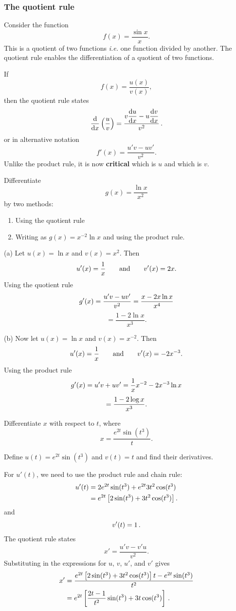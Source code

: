 \subsubsection{The quotient rule}
\label{sec:quotient}

Consider the function
\[
f(x)=\frac{\sin x}{x}.
\]
This is a quotient of two functions \textit{i.e.} one function divided by another. The quotient rule enables the differentiation of a quotient of two functions.

If
\[
f(x)=\frac{u(x)}{v(x)},
\]
then the quotient rule states
\begin{equation}
    \frac{{\rm d} }{{\rm d} x}\left(\frac{u}{v}\right)
= \frac{v\dfrac{{\rm d}u}{{\rm d}x}-u\dfrac{{\rm d}v}{{\rm d}x}}{v^2} \, .
\end{equation}
or in alternative notation
\[
f'(x)=\frac{u'v-uv'}{v^2}.
\]
Unlike the product rule, it is now \textbf{critical} which is $u$ and which is $v$.

\goodbreak
\begin{example}[Lecture]
Differentiate
\[
g(x)=\frac{\ln x}{x^2}
\]
by two methods:
\begin{enumerate}
\item[(a)] Using the quotient rule
\item[(b)] Writing as $g(x)=x^{-2}\ln x$ and using the product rule.
\end{enumerate}
\end{example}
%
\begin{solution}
(a) Let $u(x)=\ln x$ and $v(x)=x^2$. Then
\[
u'(x)=\frac{1}{x}
\qquad\text{and}\qquad
v'(x)=2x.
\]
Using the quotient rule
\[
g'(x)=\frac{u'v-uv'}{v^2}=\frac{x-2x\ln x}{x^4}
\]
\[
=\frac{1-2\ln x}{x^3}.
\]

(b) Now let $u(x)=\ln x$ and $v(x)=x^{-2}$. Then
\[
u'(x)=\frac{1}{x}
\qquad\text{and}\qquad
v'(x)=-2x^{-3}.
\]
Using the product rule
\[
g'(x)=u'v+uv'=\frac{1}{x}x^{-2}-2x^{-3}\ln x
\]
\[
=\frac{1-2\log x}{x^3}.
\]
\end{solution}

\goodbreak
\begin{example}[Video]
Differentiate $x$ with respect to $t$, where
\[
x=\frac{e^{2t}\sin(t^3)}{t}.
\]
\end{example}
%
\begin{solution}
Define $u(t)=e^{2t}\sin(t^3)$ and $v(t)=t$ and find their derivatives.

For $u'(t)$, we need to use the product rule and chain rule:
\begin{align*}
u'(t)&=2e^{2t}\sin(t^3)+e^{2t}3t^2\cos(t^3)\\
&=e^{2t}\left[2\sin(t^3)+3t^2\cos(t^3)\right].
\end{align*}
and
\[
v'(t)=1\, .
\]
The quotient rule states
\[
x'=\frac{u'v-v'u}{v^2}.
\]
Substituting in the expressions for $u$, $v$, $u'$, and $v'$ gives
\begin{align*}
x'&=\frac{e^{2t}\left[2\sin(t^3)+3t^2\cos(t^3)\right]t-e^{2t}\sin(t^3)}{t^2}\\
&=e^{2t}\left[\frac{2t-1}{t^2}\sin(t^3)+3t\cos(t^3)\right]\,.
\end{align*}
\end{solution}

